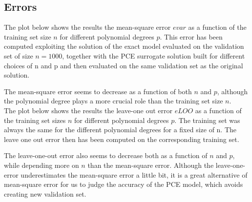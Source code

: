 \documentclass[a4paper,12pt]{article} %
\begin{document}
\subsection{Errors}
The plot below shows the results the mean-square error $evar$ as a function of the training set size $n$ for different polynomial degrees $p$. This error has been computed exploiting the solution of the exact model evaluated on the validation set of size $n=1000$, together with the PCE surrogate solution built for different choices of n and p and then evaluated on the same validation set as the original solution.
\begin{center}
\end{center}
The mean-square error seems to decrease as a function of both $n$ and $p$, although the polynomial degree plays a more crucial role than the training set size $n$.\\
The plot below shows the results the leave-one out error $eLOO$ as a function of the training set sizes $n$ for different polynomial degrees $p$. The training set was always the same for the different polynomial degrees for a fixed size of n. The leave one out error then has been computed on the corresponding training set. 
\begin{center}
\end{center}
The leave-one-out error also seems to decrease both as a function of $n$ and $p$, while depending more on $n$ than the mean-square error. Although the leave-one-error underestimates the mean-square error a little bit, it is a great alternative of mean-square error for us to judge the accuracy of the PCE model, which avoids creating new validation set.\\
\end{document}
